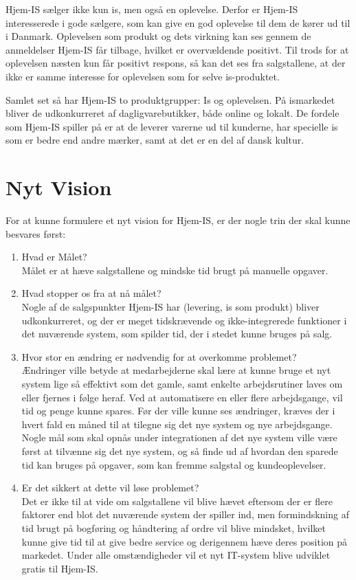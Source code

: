 Hjem-IS sælger ikke kun is, men også en oplevelse. Derfor er Hjem-IS interesserede i gode sælgere, som kan give en god oplevelse til dem de kører ud til i Danmark. Oplevelsen som produkt og dets virkning kan ses gennem de anmeldelser Hjem-IS får tilbage, hvilket er overvældende positivt. Til trods for at oplevelsen næsten kun får positivt respons, så kan det ses fra salgstallene, at der ikke er samme interesse for oplevelsen som for selve is-produktet. 

Samlet set så har Hjem-IS to produktgrupper: Is og oplevelsen. På ismarkedet bliver de udkonkurreret af dagligvarebutikker, både online og lokalt. De fordele som Hjem-IS spiller på er at de leverer varerne ud til kunderne, har specielle is som er bedre end andre mærker, samt at det er en del af dansk kultur.

\section{Nyt Vision}
For at kunne formulere et nyt vision for Hjem-IS, er der nogle trin\cite{How2bsns} der skal kunne besvares først:
\begin{enumerate}
    \item Hvad er Målet? \\
    Målet er at hæve salgstallene og mindske tid brugt på manuelle opgaver.
    \item Hvad stopper os fra at nå målet? \\
    Nogle af de salgspunkter Hjem-IS har (levering, is som produkt) bliver udkonkurreret, og der er meget tidskrævende og ikke-integrerede funktioner i det nuværende system, som spilder tid, der i stedet kunne bruges på salg.
    \item Hvor stor en ændring er nødvendig for at overkomme problemet? \\
    Ændringer ville betyde at medarbejderne skal lære at kunne bruge et nyt system lige så effektivt som det gamle, samt enkelte arbejdsrutiner laves om eller fjernes i følge heraf. Ved at automatisere en eller flere arbejdsgange, vil tid og penge kunne spares. Før der ville kunne ses ændringer, kræves der i hvert fald en måned til at tilegne sig det nye system og nye arbejdsgange. Nogle mål som skal opnås under integrationen af det nye system ville være først at tilvænne sig det nye system, og så finde ud af hvordan den sparede tid kan bruges på opgaver, som kan fremme salgstal og kundeoplevelser.
    \item Er det sikkert at dette vil løse problemet? \\
    Det er ikke til at vide om salgstallene vil blive hævet eftersom der er flere faktorer end blot det nuværende system der spiller ind, men formindskning af tid brugt på bogføring og håndtering af ordre vil blive mindsket, hvilket kunne give tid til at give bedre service og derigennem hæve deres position på markedet. Under alle omstændigheder vil et nyt IT-system blive udviklet gratis til Hjem-IS.    
\end{enumerate}

